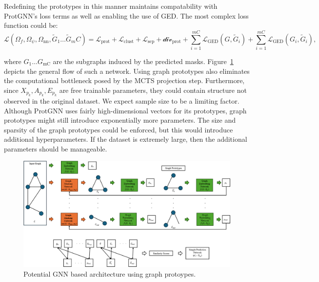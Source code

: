 \documentclass[
  11pt,
  letterpaper,
]{article}
\begin{document}
Redefining the prototypes in this manner maintains compatability with
ProtGNN's loss terms as well as enabling the use of GED. The most
complex loss function could be:\\
\begin{equation}
    \mathcal{L}(\Omega_f, \Omega_\psi, \Omega_\text{nn}, \tilde{G}_1 \dots \tilde{G}_mC) = \mathcal{L}_\text{prot} + \mathcal{L}_\text{clust} + \mathcal{L}_\text{sep} + \mathcal{div}_\text{prot} + \sum_{i = 1}^{mC} \mathcal{L}_\text{GED}(G, \tilde{G}_i) + \sum_{i = 1}^{mC} \mathcal{L}_\text{GED}(G_i, \tilde{G}_i), 
\end{equation}

where \(G_1 \dots G_\text{mC}\) are the subgraphs induced by the
predicted masks. Figure~\ref{fig-graph-prot_diag} depicts the general
flow of such a network. Using graph prototypes also eliminates the
computational bottleneck posed by the MCTS projection step. Furthermore,
since \(X_{p_k}, A_{p_k}, E_{p_k}\) are free trainable parameters, they
could contain structure not observed in the original dataset. We expect
sample size to be a limiting factor. Although ProtGNN uses fairly
high-dimensional vectors for its prototypes, graph prototypes might
still introduce exponentially more parameters. The size and sparsity of
the graph prototypes could be enforced, but this would introduce
additional hyperparameters. If the dataset is extremely large, then the
additional parameters should be manageable.

\begin{figure}

{\centering \includegraphics{figures/Graph_prot_diagram.png}

}

\caption{\label{fig-graph-prot_diag}Potential GNN based architecture
using graph protoypes.}

\end{figure}
\end{document}
